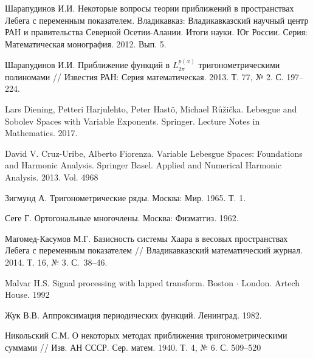 \begin{thebibliography}{1}
Шарапудинов И.И. Некоторые вопросы теории приближений в пространствах Лебега с переменным показателем. Владикавказ: Владикавказский научный центр РАН и правительства Северной Осетии-Алании. Итоги науки. Юг России. Серия: Математическая монография. 2012. Вып. 5.



 Шарапудинов И.И. Приближение функций в $L^{p(x)}_{2\pi}$ тригонометрическими полиномами // Известия РАН: Серия математическая. 2013. Т. 77, № 2. С. 197--224.

 Lars Diening, Petteri Harjulehto, Peter Hast{\"o}, Michael Růžička. Lebesgue and Sobolev Spaces with Variable Exponents. Springer. Lecture Notes in Mathematics. 2017.






 David V. Cruz-Uribe, Alberto Fiorenza. Variable Lebesgue Spaces: Foundations and Harmonic Analysis. Springer Basel. Applied and Numerical Harmonic Analysis. 2013. Vol. 4968

 Зигмунд А. Тригонометрические ряды. Москва: Мир. 1965. Т. 1.













 Сеге Г. Ортогональные многочлены. Москва: Физматгиз. 1962.

 Магомед-Касумов М.Г. Базисность системы Хаара в весовых пространствах Лебега с переменным показателем // Владикавказский математический журнал. 2014. Т. 16, № 3. С.~38--46.

Malvar H.S. Signal processing with lapped transform. Boston{ $\cdot$} London. Artech House. 1992

 Жук В.В. Аппроксимация периодических функций. Ленинград. 1982.

 Никольский С.М. О некоторых методах приближения тригонометрическими суммами // Изв. АН СССР. Сер. матем. 1940. Т. 4, № 6. С. 509--520




\end{thebibliography}
